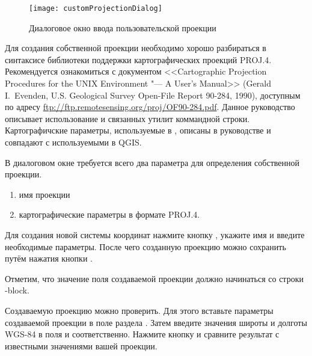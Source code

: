 \begin{figure}[ht]
   \centering
   \texttt{[image: customProjectionDialog]}
   \caption{Диалоговое окно ввода пользовательской проекции
   \wincaption}\label{fig:customprojections}
\end{figure}

Для создания собственной проекции необходимо хорошо разбираться в синтаксисе
библиотеки поддержки картографических проекций PROJ.4. Рекомендуется
ознакомиться с документом <<Cartographic Projection Procedures for
the UNIX Environment "--- A User's Manual>> (Gerald I.~Evenden, U.S.
Geological Survey Open-File Report 90-284, 1990), доступным по адресу
\url{ftp://ftp.remotesensing.org/proj/OF90-284.pdf}.
Данное руководство описывает использование  и связанных
утилит коммандной строки. Картографичские параметры, используемые в
, описаны в руководстве и совпадают с используемыми в QGIS.

В диалоговом окне 
требуется всего два параметра для определения собственной проекции.
\begin{enumerate}
\item имя проекции
\item картографические параметры в формате PROJ.4.
\end{enumerate}
Для создания новой системы координат нажмите кнопку
, укажите имя и введите необходимые параметры. После
чего созданную проекцию можно сохранить путём нажатия кнопки
.

Отметим, что значение поля  создаваемой проекции должно
начинаться со строки -block.

Создаваемую проекцию можно проверить.
Для этого вставьте параметры создаваемой проекции в поле
 раздела . Затем введите значения
широты и долготы WGS-84 в поля  и 
соответственно. Нажмите кнопку  и сравните результат
с известными значениями вашей проекции.

\FloatBarrier
